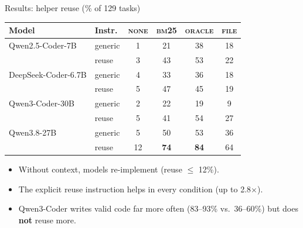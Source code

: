 \documentclass[aspectratio=169,11pt]{beamer}
\begin{document}
\begin{frame}{Results: helper reuse (\% of 129 tasks)}
  \centering\small
  \begin{tabular}{llcccc}
    \toprule
    Model & Instr. & \textsc{none} & \textsc{bm25} & \textsc{oracle} & \textsc{file} \\
    \midrule
    Qwen2.5-Coder-7B & generic & 1 & 21 & 38 & 18 \\
                     & reuse   & 3 & 43 & 53 & 22 \\
    DeepSeek-Coder-6.7B & generic & 4 & 33 & 36 & 18 \\
                        & reuse   & 5 & 47 & 45 & 19 \\
    Qwen3-Coder-30B & generic & 2 & 22 & 19 & 9 \\
                    & reuse   & 5 & 41 & 54 & 27 \\
    Qwen3.8-27B & generic & 5 & 50 & 53 & 36 \\
                & reuse   & 12 & \textbf{74} & \textbf{84} & 64 \\
    \bottomrule
  \end{tabular}
  \vspace{0.6em}
  \begin{itemize}\small
    \item Without context, models re-implement (reuse $\le$ 12\%).
    \item The explicit reuse instruction helps in every condition (up to 2.8$\times$).
    \item Qwen3-Coder writes valid code far more often (83--93\% vs.\ 36--60\%) but does \textbf{not} reuse more.
  \end{itemize}
\end{frame}
\end{document}

